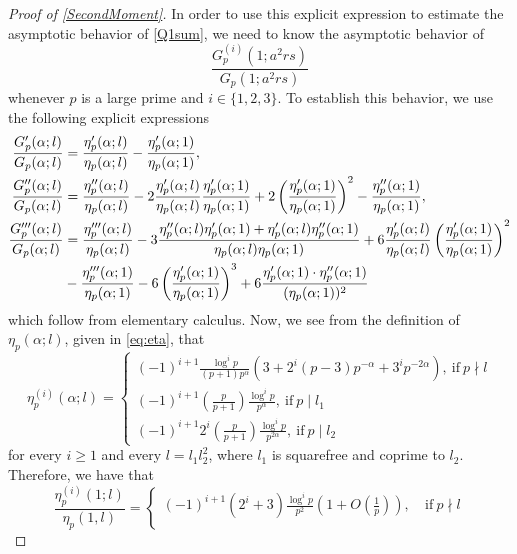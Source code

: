 \documentclass[10pt,a4paper]{amsart}
\theoremstyle{plain}
\theoremstyle{definition}
\theoremstyle{remark}
\begin{document}
\begin{proof}[Proof of \cref{SecondMoment}]
In order to use this explicit expression to estimate the asymptotic behavior of \eqref{Q1sum}, we need to know the asymptotic behavior of 
\[
    \frac{G_p^{(i)}(1;a^2rs)}{G_p(1;a^2 r s)}
\]
whenever $p$ is a large prime and $i \in \{1,2,3\}$. To establish this behavior, we use the following explicit expressions
\begin{align}
\label{eq:G_logarithmic_derivative_1}\frac{G'_{p}(\alpha;l)}{G_{p}(\alpha;l)}&= \frac{\eta'_p(\alpha;l)}{\eta_p(\alpha;l)}-\frac{\eta'_p(\alpha;1)}{\eta_p(\alpha;1)},\\
\frac{G''_{p}(\alpha;l)}{G_{p}(\alpha;l)}&=\frac{\eta''_p(\alpha;l)}{\eta_p(\alpha;l)}-2\frac{\eta'_p(\alpha;l)}{\eta_p(\alpha;l)}\frac{\eta'_p(\alpha;1)}{\eta_p(\alpha;1)}+2\left(\frac{\eta'_p(\alpha;1)}{\eta_p(\alpha;1)}\right)^2-\frac{\eta''_p(\alpha;1)}{\eta_p(\alpha;1)}, \label{eq:G_logarithmic_derivative_2}\\
\label{eq:G_logarithmic_derivative_3} \frac{G'''_{p}(\alpha;l)}{G_{p}(\alpha;l)}&=\frac{\eta'''_p(\alpha;l)}{\eta_p(\alpha;l)} -3 \frac{\eta_p''(\alpha;l) \eta_p'(\alpha;1) + \eta_p'(\alpha;l) \eta_p''(\alpha;1)}{\eta_p(\alpha;l) \eta_p(\alpha;1)} + 6 \frac{\eta_p'(\alpha;l)}{\eta_p(\alpha;l)} \left( \frac{\eta_p'(\alpha;1)}{\eta_p(\alpha;1)} \right)^2 \\ \notag &- \frac{\eta_p'''(\alpha;1)}{\eta_p(\alpha;1)} - 6 \left( \frac{\eta_p'(\alpha;1)}{\eta_p(\alpha;1)} \right)^3 + 6 \frac{\eta_p'(\alpha;1) \cdot \eta_p''(\alpha;1)}{(\eta_p(\alpha;1))^2}
\end{align}
which follow from elementary calculus.
Now, we see from the definition of $\eta_p(\alpha;l)$, given in \eqref{eq:eta}, that
\[
    \eta_p^{(i)}(\alpha;l) = \begin{cases}
        (-1)^{i+1} \frac{\log^{i}p}{(p+1)p^\alpha} \left( 3 + 2^i (p-3) p^{-\alpha} + 3^i p^{-2\alpha} \right), \ \text{if} \ p \nmid l \\
        (-1)^{i+1} \left( \frac{p}{p+1} \right) \frac{\log^{i}p}{p^\alpha}, \ \text{if} \ p \mid l_1 \\
        (-1)^{i+1} 2^i \left( \frac{p}{p+1} \right) \frac{\log^{i}p}{p^{2 \alpha}}, \ \text{if} \ p \mid l_2
    \end{cases}
\]
for every $i \geq 1$ and every $l = l_1 l_2^2$, where $l_1$ is squarefree and coprime to $l_2$. Therefore, we have that
\[
\frac{\eta_p^{(i)}(1;l)}{\eta_p(1,l)} = \begin{cases}
    (-1)^{i+1} (2^i + 3) \frac{\log^ip}{p^2} \left( 1 + O(\frac{1}{p}) \right), \ &\text{if} \ p \nmid l \\

\end{cases}\]
\end{proof}
\end{document}
